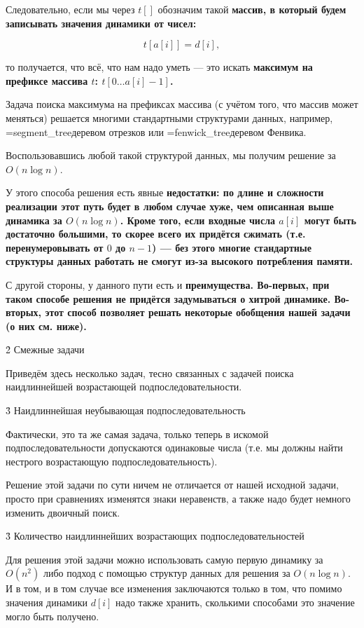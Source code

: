 Следовательно, если мы через $t[]$ обозначим такой \bf{массив}, в который будем записывать значения динамики от чисел:

$$ t[a[i]] = d[i], $$

то получается, что всё, что нам надо уметь --- это искать \bf{максимум на префиксе} массива $t$: $t[0 \ldots a[i]-1]$.

Задача поиска максимума на префиксах массива (с учётом того, что массив может меняться) решается многими стандартными структурами данных, например, \algohref=segment_tree{деревом отрезков} или \algohref=fenwick_tree{деревом Фенвика}.

Воспользовавшись любой такой структурой данных, мы получим решение за $O (n \log n)$.

У этого способа решения есть явные \bf{недостатки}: по длине и сложности реализации этот путь будет в любом случае хуже, чем описанная выше динамика за $O (n \log n)$. Кроме того, если входные числа $a[i]$ могут быть достаточно большими, то скорее всего их придётся сжимать (т.е. перенумеровывать от $0$ до $n-1$) --- без этого многие стандартные структуры данных работать не смогут из-за высокого потребления памяти.

С другой стороны, у данного пути есть и \bf{преимущества}. Во-первых, при таком способе решения не придётся задумываться о хитрой динамике. Во-вторых, этот способ позволяет решать некоторые обобщения нашей задачи (о них см. ниже).



\h2{ Смежные задачи }

Приведём здесь несколько задач, тесно связанных с задачей поиска наидлиннейшей возрастающей подпоследовательности.


\h3{ Наидлиннейшая неубывающая подпоследовательность }

Фактически, это та же самая задача, только теперь в искомой подпоследовательности допускаются одинаковые числа (т.е. мы должны найти нестрого возрастающую подпоследовательность).

Решение этой задачи по сути ничем не отличается от нашей исходной задачи, просто при сравнениях изменятся знаки неравенств, а также надо будет немного изменить двоичный поиск.


\h3{ Количество наидлиннейших возрастающих подпоследовательностей }

Для решения этой задачи можно использовать самую первую динамику за $O (n^2)$ либо подход с помощью структур данных для решения за $O (n \log n)$. И в том, и в том случае все изменения заключаются только в том, что помимо значения динамики $d[i]$ надо также хранить, сколькими способами это значение могло быть получено.

